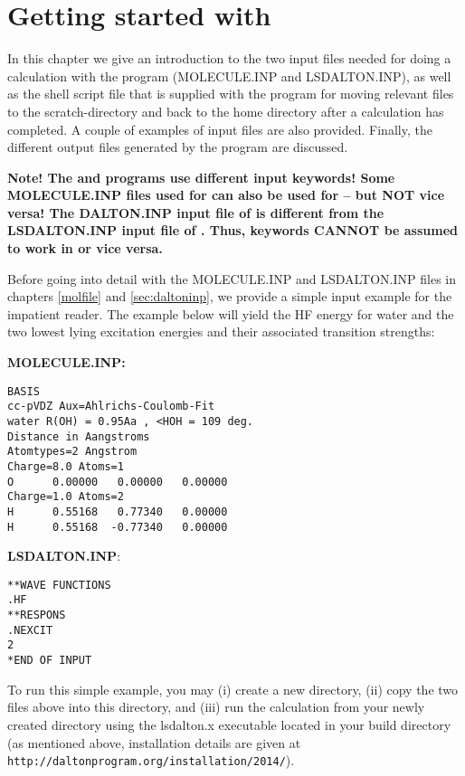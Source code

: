 \chapter{Getting started with {\lsdalton}}\label{ch:starting}

In this chapter we give an introduction to the two input files needed
for doing a calculation with the {\lsdalton} program
(MOLECULE.INP and LSDALTON.INP), as well as the
shell script file that is supplied with the program for moving
relevant files to the scratch-directory and back to the home directory
after a calculation has completed. A couple of examples of
input files  are also provided. Finally, the different output files
generated by the program are discussed.

\textbf{Note! The {\dalton} and {\lsdalton} programs use different input keywords! Some MOLECULE.INP files used for {\lsdalton} can also be used for 
 {\dalton} -- but NOT vice versa! The DALTON.INP input file of  {\dalton} is different from the LSDALTON.INP input file of {\lsdalton}.
Thus, {\dalton} keywords CANNOT be assumed to work in {\lsdalton} or vice versa.}

Before going into detail with the 
MOLECULE.INP and LSDALTON.INP files in chapters \ref{molfile} and \ref{sec:daltoninp},
we provide a simple input example for the impatient reader. The example below
will yield the HF energy for water and the
two lowest lying excitation energies and their associated transition strengths:

\vspace{1 cm}

{\noindent \textbf{MOLECULE.INP:}}
\begin{verbatim}
BASIS
cc-pVDZ Aux=Ahlrichs-Coulomb-Fit
water R(OH) = 0.95Aa , <HOH = 109 deg.
Distance in Aangstroms
Atomtypes=2 Angstrom
Charge=8.0 Atoms=1
O      0.00000   0.00000   0.00000
Charge=1.0 Atoms=2
H      0.55168   0.77340   0.00000
H      0.55168  -0.77340   0.00000
\end{verbatim} 

\vspace{1 cm}

{\noindent \textbf{LSDALTON.INP}:}
\begin{verbatim}
**WAVE FUNCTIONS
.HF
**RESPONS
.NEXCIT
2
*END OF INPUT
\end{verbatim}

To run this simple example, you may (i) create a new directory, (ii) copy the two files above into this directory,
and (iii) run the calculation from your newly created directory using the lsdalton.x executable located in your build directory (as mentioned above, installation details are given at 
\verb|http://daltonprogram.org/installation/2014/|).

